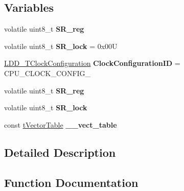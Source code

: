 \subsection*{Variables}
\begin{DoxyCompactItemize}
\item 
volatile uint8\+\_\+t {\bfseries S\+R\+\_\+reg}\hypertarget{group___c_p_u___init__module_ga326c16dd0db38f80ec48c7727d764481}{}\label{group___c_p_u___init__module_ga326c16dd0db38f80ec48c7727d764481}

\item 
volatile uint8\+\_\+t {\bfseries S\+R\+\_\+lock} = 0x00U\hypertarget{group___c_p_u___init__module_ga08ee8b0f642aeef5bbbce3bb4ec1bb28}{}\label{group___c_p_u___init__module_ga08ee8b0f642aeef5bbbce3bb4ec1bb28}

\item 
\hyperlink{group___p_e___types__module_ga369bcaf7f00caad5f994c72ac2629a37}{L\+D\+D\+\_\+\+T\+Clock\+Configuration} {\bfseries Clock\+Configuration\+ID} = C\+P\+U\+\_\+\+C\+L\+O\+C\+K\+\_\+\+C\+O\+N\+F\+I\+G\+\_\hypertarget{group___c_p_u___init__module_ga70d1987e99aada66291a145f052c90fa}{}\label{group___c_p_u___init__module_ga70d1987e99aada66291a145f052c90fa}

\item 
volatile uint8\+\_\+t {\bfseries S\+R\+\_\+reg}\hypertarget{group___c_p_u___init__module_ga326c16dd0db38f80ec48c7727d764481}{}\label{group___c_p_u___init__module_ga326c16dd0db38f80ec48c7727d764481}

\item 
volatile uint8\+\_\+t {\bfseries S\+R\+\_\+lock}\hypertarget{group___c_p_u___init__module_ga08ee8b0f642aeef5bbbce3bb4ec1bb28}{}\label{group___c_p_u___init__module_ga08ee8b0f642aeef5bbbce3bb4ec1bb28}

\item 
const \hyperlink{structt_vector_table}{t\+Vector\+Table} {\bfseries \+\_\+\+\_\+vect\+\_\+table}\hypertarget{group___c_p_u___init__module_ga17baaa5ab2c8895394c51a01248c5195}{}\label{group___c_p_u___init__module_ga17baaa5ab2c8895394c51a01248c5195}

\end{DoxyCompactItemize}


\subsection{Detailed Description}


\subsection{Function Documentation}
